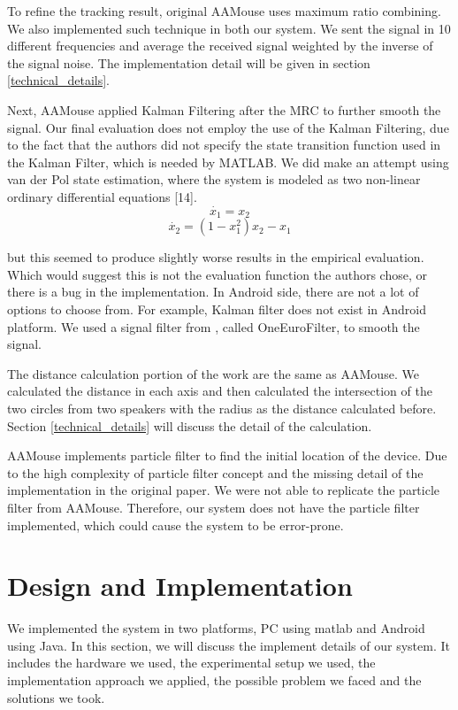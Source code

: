 \documentclass{acm_proc_article-sp}
\begin{document}
To refine the tracking result, original AAMouse uses maximum ratio combining. We also
implemented such technique in both our system. We sent the signal in 10 different
frequencies and average the received signal weighted by the inverse of the signal noise.
The implementation detail will be given in section \ref{technical_details}.

Next, AAMouse applied Kalman Filtering after the MRC to further smooth the signal.
Our final evaluation does not employ the use of the Kalman Filtering, due to the fact that the authors did not specify the state transition function used in the Kalman Filter, which is needed by MATLAB. We did make an attempt using van der Pol state estimation, where the system is modeled as two non-linear ordinary differential equations [14].
$$
\dot{x_1} = x_2
$$
$$
\dot{x_2} = (1-x_1^2) x_2-x_1
$$

but this seemed to produce slightly worse results in the empirical evaluation. Which would suggest this is not the evaluation function the authors chose, or there is a bug in the implementation. 
In Android side, there are not a lot of options to choose from. For example, 
Kalman filter does not exist in Android platform.
We used a signal
filter from \cite{SignalFilter}, called OneEuroFilter, to smooth the signal.

The distance calculation portion of the work are the same as AAMouse. We calculated the
distance in each axis and then calculated the intersection of the two circles from two
speakers with the radius as the distance calculated before. Section
\ref{technical_details} will discuss the detail of the calculation.

AAMouse implements particle filter to find the initial location of the device. Due to the 
high complexity of particle filter concept and the missing detail of the implementation
in the original paper. We were not able to replicate the particle filter from AAMouse.
Therefore, our system does not have the particle filter implemented, which could cause
the system to be error-prone.

\section{Design and Implementation} \label{design_and_implementation}
We implemented the system in two platforms, PC using matlab and Android using Java. In 
this section, we will discuss the implement details of our system. It includes the 
hardware we used, the experimental setup we used, the implementation approach we applied,
the possible problem we faced and the solutions we took.
\end{document}
